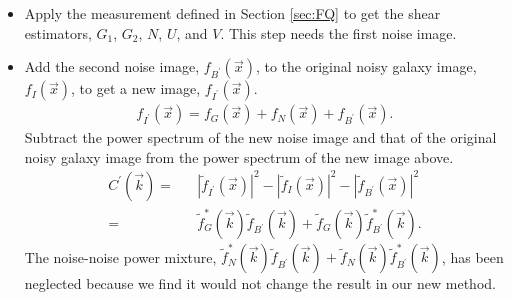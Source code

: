 \documentclass[twocolumn]{aastex62}
\begin{document}
\begin{itemize}
	
	\item Apply the measurement defined in Section \ref{sec:FQ} to get the shear estimators, $G_1$, $G_2$, $N$, $U$, and $V$. This step needs the first noise image.

	\item Add the second noise image, $f_{B^{\prime}}(\vec{x})$, to the original noisy galaxy image, $f_I(\vec{x})$, to get a new image, $f_{I^{\prime}}(\vec{x})$.
	\begin{eqnarray}
	f_{I^{\prime}}(\vec{x}) = f_G(\vec{x}) + f_N(\vec{x}) + f_{B^{\prime}}(\vec{x}).
	\end{eqnarray}
	Subtract the power spectrum of the new noise image and that of the original noisy galaxy image from the power spectrum of the new image above.
	\begin{eqnarray}
	C^{\prime}(\vec{k})=&&\left\vert \widetilde{f}_{I^{\prime}}(\vec{x})\right\vert^2 - \left\vert \widetilde{f}_{I}(\vec{x})\right\vert^2 - \left\vert \widetilde{f}_{B^{\prime}}(\vec{x})\right\vert^2 \\ \nonumber
	 =&& \widetilde{f}_{G}^{*}(\vec{k})\widetilde{f}_{B^{\prime}}(\vec{k}) + \widetilde{f}_{G}(\vec{k})\widetilde{f}_{B^{\prime}}^{*}(\vec{k}).
	\end{eqnarray}
	The noise-noise power mixture, $\widetilde{f}_{N}^{*}(\vec{k})\widetilde{f}_{B^{\prime}}(\vec{k}) + \widetilde{f}_{N}(\vec{k})\widetilde{f}_{B^{\prime}}^{*}(\vec{k})$, has been neglected because we find it would not change the result in our new method.
	

\end{itemize}
\end{document}
